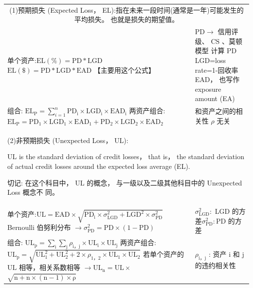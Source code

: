 \begin{center}
{\begin{tabular}{|p{}|p{}|}
    \hline
    \multicolumn{2}{|c|}{(1)预期损失 (Expected Loss， EL):指在未来一段时间(通常是一年)可能发生的平均损失。 也就是损失的期望值。} \\
    \cline{1-2}
    单个资产:\newline  \(\mathrm{{EL}}\left( \% \right)  = \mathrm{{PD}} * \mathrm{{LGD}}\) \newline   \(\mathrm{{EL}}\left( \$ \right)  = \mathrm{{PD}} * \mathrm{{LGD}} * \mathrm{{EAD}}\) 【主要用这个公式】 & \(\mathrm{{PD}} \rightarrow\) 信用评级、 \(\mathrm{{CS}}\) 、莫顿模型   \newline  计算 PD   \newline   LGD=loss rate=1-回收率 \newline   EAD， 也写作 exposure amount (EA) \\
    \cline{1-2}
    组合: \({\mathrm{{EL}}}_{\mathrm{P}} = \mathop{\sum }\limits_{{i = 1}}^{n}{\mathrm{{PD}}}_{\mathrm{i}} \times  {\mathrm{{LGD}}}_{\mathrm{i}} \times  {\mathrm{{EAD}}}_{\mathrm{i}}\) \newline 两资产组合:\({\mathrm{{EL}}}_{\mathrm{P}} = {\mathrm{{PD}}}_{1} \times  {\mathrm{{LGD}}}_{1} \times  {\mathrm{{EAD}}}_{1} + {\mathrm{{PD}}}_{2} \times  {\mathrm{{LGD}}}_{2} \times  {\mathrm{{EAD}}}_{2}\) & 和资产之间的相关性 \(\rho\) 无关 \\
    \cline{1-2}
    \multicolumn{2}{|p{1.2\textwidth}|}{(2)非预期损失 (Unexpected Loss， UL): \par  UL is the standard deviation of credit losses， that is， the standard deviation of actual credit losses around the expected loss average (EL). \par  切记: 在这个科目中， UL 的概念， 与一级以及二级其他科目中的 Unexpected Loss 概念不 同。} \\
    \cline{1-2}
    单个资产:\newline \(\mathrm{{UL}} = \mathrm{{EAD}} \times  \sqrt{{\mathrm{{PD}}}_{\mathrm{i}} \times  {\sigma }_{\mathrm{{LGD}}}^{2} + {\mathrm{{LGD}}}^{2} \times  {\sigma }_{\mathrm{{PD}}}^{2}}\) \newline Bernoulli 伯努利分布 \(\rightarrow  {\sigma }_{\mathrm{{PD}}}^{2} = \mathrm{{PD}} \times  \left( {1 - \mathrm{{PD}}}\right)\) & \({\sigma }_{\mathrm{{LGD}}}^{2} :\) LGD 的方差\newline \({\sigma }_{\mathrm{{PD}}}^{2} : \mathrm{{PD}}\) 的方差 \\
    \cline{1-2}
    组合: \({\mathrm{{UL}}}_{\mathrm{p}} = \mathop{\sum }\limits_{\mathrm{i}}\mathop{\sum }\limits_{\mathrm{j}}{\rho }_{\mathrm{i}，\mathrm{j}} \times  {\mathrm{{UL}}}_{\mathrm{i}} \times  {\mathrm{{UL}}}_{\mathrm{j}}\) 两资产组合: \({\mathrm{{UL}}}_{\mathrm{p}} = \sqrt{{\mathrm{{UL}}}_{1}^{2} + {\mathrm{{UL}}}_{2}^{2} + 2 \times  {\rho }_{1，2} \times  {\mathrm{{UL}}}_{1} \times  {\mathrm{{UL}}}_{2}}\) 若单个资产的 \(\mathrm{{UL}}\) 相等，相关系数相等 \(\rightarrow  {\mathrm{{UL}}}_{\mathrm{n}} = \mathrm{{UL}} \times\)  \(\sqrt{\mathrm{n} + \mathrm{n} \times  \left( {\mathrm{n} - 1}\right)  \times  \mathrm{\rho }}\) & \({\rho }_{\mathrm{i}，\mathrm{j}}\) : 资产 \(\mathrm{i}\) 和 \(\mathrm{j}\) 的违约相关性 \\

\end{tabular}}
\end{center}
